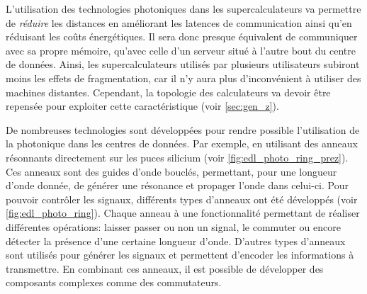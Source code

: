    
        L'utilisation des technologies photoniques dans les supercalculateurs va permettre de \textit{réduire} les distances en améliorant les latences de communication ainsi qu'en réduisant les coûts énergétiques. Il sera donc presque équivalent de communiquer avec sa propre mémoire, qu'avec celle d'un serveur situé à l'autre bout du centre de données. Ainsi, les supercalculateurs utilisés par plusieurs utilisateurs subiront moins les effets de fragmentation, car il n'y aura plus d'inconvénient à utiliser des machines distantes. Cependant, la topologie des calculateurs va devoir être repensée pour exploiter cette caractéristique (voir \autoref{sec:gen_z}).
        
        
        De nombreuses technologies sont développées pour rendre possible l'utilisation de la photonique dans les centres de données. Par exemple, en utilisant des anneaux résonnants directement sur les puces silicium (voir \autoref{fig:edl_photo_ring_prez}). Ces anneaux sont des guides d’onde bouclés, permettant, pour une longueur d'onde donnée, de générer une résonance et propager l'onde dans celui-ci. Pour pouvoir contrôler les signaux, différents types d'anneaux ont été développés (voir \autoref{fig:edl_photo_ring}). Chaque anneau à une fonctionnalité permettant de réaliser différentes opérations: laisser passer ou non un signal, le commuter ou encore détecter la présence d'une certaine longueur d'onde. D'autres types d'anneaux sont utilisés pour générer les signaux et permettent d'encoder les informations à transmettre. En combinant ces anneaux, il est possible de développer des composants complexes comme des commutateurs.
        
